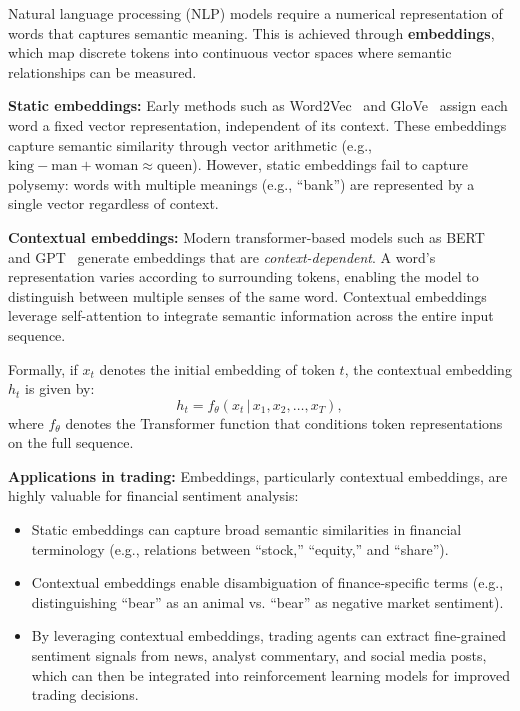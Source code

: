 \documentclass[12pt,a4paper]{report}
\begin{document}
Natural language processing (NLP) models require a numerical representation of words that captures semantic meaning. This is achieved through \textbf{embeddings}, which map discrete tokens into continuous vector spaces where semantic relationships can be measured.

\bigskip
\textbf{Static embeddings:}  
Early methods such as Word2Vec~\cite{mikolov2013efficient} and GloVe~\cite{pennington2014glove} assign each word a fixed vector representation, independent of its context. These embeddings capture semantic similarity through vector arithmetic (e.g., $\text{king} - \text{man} + \text{woman} \approx \text{queen}$). However, static embeddings fail to capture polysemy: words with multiple meanings (e.g., “bank”) are represented by a single vector regardless of context.

\bigskip
\textbf{Contextual embeddings:}  
Modern transformer-based models such as BERT~\cite{devlin2019bert} and GPT~\cite{radford2019language} generate embeddings that are \textit{context-dependent}. A word’s representation varies according to surrounding tokens, enabling the model to distinguish between multiple senses of the same word. Contextual embeddings leverage self-attention to integrate semantic information across the entire input sequence.

Formally, if $x_t$ denotes the initial embedding of token $t$, the contextual embedding $h_t$ is given by:
\[
h_t = f_{\theta}(x_t \,|\, x_1, x_2, \ldots, x_T),
\]
where $f_{\theta}$ denotes the Transformer function that conditions token representations on the full sequence.

\bigskip
\textbf{Applications in trading:}  
Embeddings, particularly contextual embeddings, are highly valuable for financial sentiment analysis:
\begin{itemize}
    \item Static embeddings can capture broad semantic similarities in financial terminology (e.g., relations between “stock,” “equity,” and “share”).
    \item Contextual embeddings enable disambiguation of finance-specific terms (e.g., distinguishing “bear” as an animal vs. “bear” as negative market sentiment).
    \item By leveraging contextual embeddings, trading agents can extract fine-grained sentiment signals from news, analyst commentary, and social media posts, which can then be integrated into reinforcement learning models for improved trading decisions.
\end{itemize}
\end{document}
